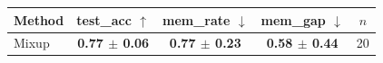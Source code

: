 \begin{tabular}{lcccc}
\toprule
Method & test\_acc $\uparrow$ & mem\_rate $\downarrow$ & mem\_gap $\downarrow$ & $n$ \\
\midrule
Mixup & \textbf{0.77 $\pm$ 0.06} & \textbf{0.77 $\pm$ 0.23} & \textbf{0.58 $\pm$ 0.44} & 20 \\
\bottomrule
\end{tabular}
